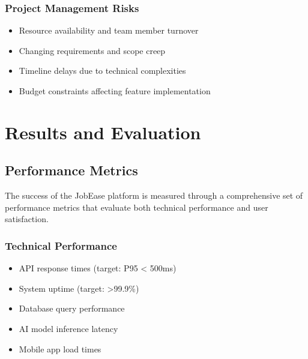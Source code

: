 \documentclass[12pt,a4paper]{report}
\begin{document}
\subsection{Project Management Risks}
\begin{itemize}[leftmargin=2em]
  \item Resource availability and team member turnover
  \item Changing requirements and scope creep
  \item Timeline delays due to technical complexities
  \item Budget constraints affecting feature implementation
\end{itemize}

\chapter{Results and Evaluation}

\section{Performance Metrics}
The success of the JobEase platform is measured through a comprehensive set of performance metrics that evaluate both technical performance and user satisfaction.

\subsection{Technical Performance}
\begin{itemize}[leftmargin=2em]
  \item API response times (target: P95 < 500ms)
  \item System uptime (target: >99.9\%)
  \item Database query performance
  \item AI model inference latency
  \item Mobile app load times
\end{itemize}
\end{document}
